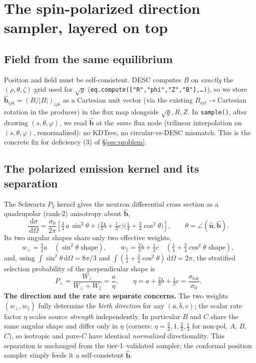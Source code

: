 \documentclass[11pt]{article}
\newcommand{\sg}{\sqrt{g}}
\newcommand{\bhat}{\hat{\mathbf{b}}}
\newcommand{\uhat}{\hat{\mathbf{u}}}
\newcommand{\dd}{\,\mathrm{d}}
\newcommand{\code}[1]{\texttt{#1}}
\begin{document}
\section{The spin-polarized direction sampler, layered on top}
\label{sec:spf}

\subsection{Field from the same equilibrium}
\label{sec:field}

Position and field must be self-consistent. DESC computes $B$ on \emph{exactly} the
$(\rho,\theta,\zeta)$ grid used for $\sg$ (\code{eq.compute(["R","phi","Z","B"],\dots)}),
so we store $\bhat_{ijk}=(B/|B|)_{ijk}$ as a Cartesian unit vector (via the existing
$B_{\mathrm{cyl}}\!\to\!$Cartesian rotation in the producer) in the flux map alongside
$\sg,R,Z$. In \code{sample()}, after drawing $(s,\theta,\varphi)$, we read $\bhat$ at
the \emph{same} flux node (trilinear interpolation on $(s,\theta,\varphi)$,
renormalized): no KDTree, no circular-vs-DESC mismatch. This is the concrete fix for
deficiency (3) of \S\ref{sec:problem}.

\subsection{The polarized emission kernel and its separation}

The Schwartz $P_2$ kernel gives the neutron differential cross section as a
quadrupolar (rank-2) anisotropy about $\bhat$,
\begin{equation}
\frac{\dd\sigma}{\dd\Omega}=\frac{\sigma_0}{2\pi}\left[
\tfrac34\,a\,\sin^2\theta+\Big(\tfrac23 b+\tfrac13 c\Big)\Big(\tfrac14+\tfrac34\cos^2\theta\Big)\right],
\qquad\theta=\angle(\uhat,\bhat).
\label{eq:kernel}
\end{equation}
Its two angular shapes share only two effective weights,
\begin{equation}
w_\perp=\tfrac34 a\quad(\sin^2\theta\text{ shape}),\qquad
w_\parallel=\tfrac23 b+\tfrac13 c\quad(\tfrac14+\tfrac34\cos^2\theta\text{ shape}),
\end{equation}
and, using $\int\sin^2\theta\dd\Omega=8\pi/3$ and
$\int(\tfrac14+\tfrac34\cos^2\theta)\dd\Omega=2\pi$, the stratified selection
probability of the perpendicular shape is
\begin{equation}
P_\perp=\frac{W_\perp}{W_\perp+W_\parallel}=\frac{a}{\eta},\qquad
\eta=a+\tfrac23 b+\tfrac13 c=\frac{\sigma_{\mathrm{tot}}}{\sigma_0}.
\label{eq:eta}
\end{equation}
\textbf{The direction and the rate are separate concerns.} The two weights
$(w_\perp,w_\parallel)$ fully determine the \emph{birth direction} for any $(a,b,c)$;
the scalar rate factor $\eta$ scales source \emph{strength} independently. In
particular $B$ and $C$ share the same angular shape and differ only in $\eta$
(corners: $\eta=\tfrac23,1,\tfrac23,\tfrac13$ for non-pol, $A$, $B$, $C$), so
isotropic and pure-$C$ have identical \emph{normalized} directionality. This
separation is unchanged from the tier-1--validated sampler; the conformal position
sampler simply feeds it a self-consistent $\bhat$.
\end{document}
